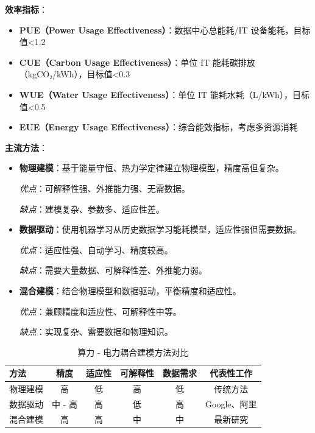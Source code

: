 \documentclass[12pt,a4paper]{article}
\begin{document}
\textbf{效率指标}：
\begin{itemize}
    \item \textbf{PUE（Power Usage Effectiveness）}：数据中心总能耗/IT 设备能耗，目标值<1.2
    \item \textbf{CUE（Carbon Usage Effectiveness）}：单位 IT 能耗碳排放（kgCO₂/kWh），目标值<0.3
    \item \textbf{WUE（Water Usage Effectiveness）}：单位 IT 能耗水耗（L/kWh），目标值<0.5
    \item \textbf{EUE（Energy Usage Effectiveness）}：综合能效指标，考虑多资源消耗
\end{itemize}

\textbf{主流方法}：

\begin{itemize}
    \item \textbf{物理建模}：基于能量守恒、热力学定律建立物理模型，精度高但复杂。
    
    \textit{优点}：可解释性强、外推能力强、无需数据。
    
    \textit{缺点}：建模复杂、参数多、适应性差。
    
    \item \textbf{数据驱动}：使用机器学习从历史数据学习能耗模型，适应性强但需要数据。
    
    \textit{优点}：适应性强、自动学习、精度较高。
    
    \textit{缺点}：需要大量数据、可解释性差、外推能力弱。
    
    \item \textbf{混合建模}：结合物理模型和数据驱动，平衡精度和适应性。
    
    \textit{优点}：兼顾精度和适应性、可解释性中等。
    
    \textit{缺点}：实现复杂、需要数据和物理知识。
\end{itemize}

\begin{table}[h]
\centering
\caption{算力 - 电力耦合建模方法对比}
\label{tab:coupling-model}
\begin{tabular}{@{}lccccc@{}}
\toprule
\textbf{方法} & \textbf{精度} & \textbf{适应性} & \textbf{可解释性} & \textbf{数据需求} & \textbf{代表性工作} \\
\midrule
物理建模 & 高 & 低 & 高 & 低 & 传统方法 \\
数据驱动 & 中 - 高 & 高 & 低 & 高 & Google、阿里 \\
混合建模 & 高 & 高 & 中 & 中 & 最新研究 \\
\bottomrule
\end{tabular}
\end{table}
\end{document}
